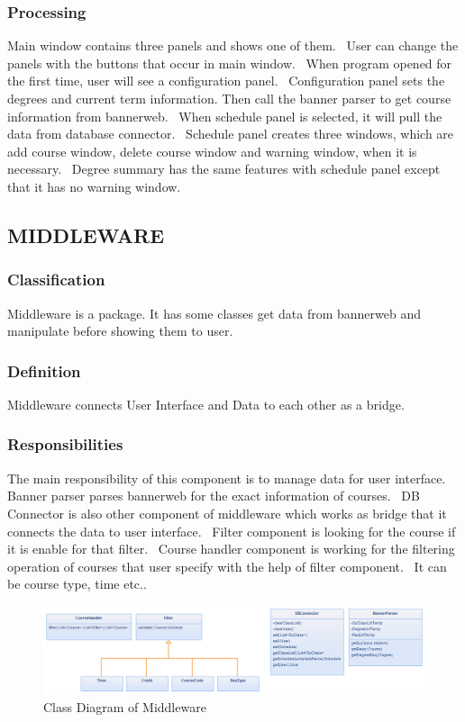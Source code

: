 \documentclass[twoside,letterpaper]{article}
\begin{document}
\subsubsection{Processing}
Main window contains three panels and shows one of them. \ User can change the panels with the buttons that occur in main window. \ When program opened for the first time, user will see a configuration panel. \ Configuration panel sets the degrees and current term information. Then call the banner parser to get course information from bannerweb. \ When schedule panel is selected, it will pull the data from database connector. \ Schedule panel creates three windows, which are add course window, delete course window and warning window, when it is necessary. \  Degree summary has the same features with schedule panel except that it has no warning window.
\subsection{MIDDLEWARE}
\subsubsection{Classification}
Middleware is a package. It has some classes get data from bannerweb and manipulate before showing them to user.
\subsubsection{Definition}
Middleware connects User Interface and Data to each other as a bridge.
\subsubsection{Responsibilities}
The main responsibility of this component is to manage data for user interface. Banner parser parses  bannerweb for the exact information of courses. \ DB Connector is also other component of middleware which works as bridge that it connects the data to user interface. \ Filter component is looking for the course if it is enable for that filter. \ Course handler component is working for the filtering operation of courses that user specify with the help of filter component. \ It can be course type, time etc..
\begin{figure}[h]
\centering
\includegraphics[width=\linewidth]{middleware.png}
\caption{Class Diagram of Middleware}
\end{figure}
\end{document}

